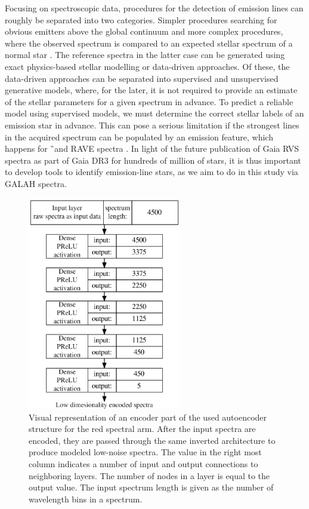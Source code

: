 Focusing on spectroscopic data, procedures for the detection of emission lines can roughly be separated into two categories. Simpler procedures searching for obvious emitters above the global continuum \cite{2015A&A...581A..52T, 2016ASPC..505...66N, 2016RAA....16..138H, 2016ASPC..505...66N} and more complex procedures, where the observed spectrum is compared to an expected stellar spectrum of a normal star \cite{2013ApJ...776..127Z}. The reference spectra in the latter case can be generated using exact physics-based stellar modelling or data-driven approaches. Of these, the data-driven approaches can be separated into supervised and unsupervised generative models, where, for the later, it is not required to provide an estimate of the stellar parameters for a given spectrum in advance. To predict a reliable model using supervised models, we must determine the correct stellar labels of an emission star in advance. This can pose a serious limitation if the strongest lines in the acquired spectrum can be populated by an emission feature, which happens for \G\ and RAVE spectra \cite{2013ApJ...776..127Z}. In light of the future publication of Gaia RVS spectra as part of Gaia DR3 for hundreds of million of stars, it is thus important to develop tools to identify emission-line stars, as we aim to do in this study via GALAH spectra.

\begin{figure}
	\centering
	\includegraphics[width=0.6\textwidth]{ann_network_structure_a.png}
	\caption{Visual representation of an encoder part of the used autoencoder structure for the red spectral arm. After the input spectra are encoded, they are passed through the same inverted architecture to produce modeled low-noise spectra. The value in the right most column indicates a number of input and output connections to neighboring layers. The number of nodes in a layer is equal to the output value. The input spectrum length is given as the number of wavelength bins in a spectrum.}
	\label{fig:autoann}
\end{figure}

